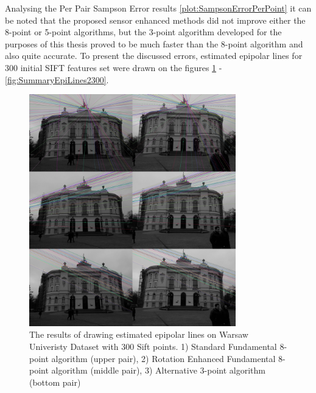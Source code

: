 Analysing the Per Pair Sampson Error results \ref{plot:SampsonErrorPerPoint} it can be noted that the proposed sensor enhanced methods did not improve either the 8-point or 5-point algorithms, but the 3-point algorithm developed for the purposes of this thesis proved to be much faster than the 8-point algorithm and also quite accurate. To present the discussed errors, estimated epipolar lines for 300 initial SIFT features set were drawn on the figures \ref{fig:SummaryEpiLines1300} - \ref{fig:SummaryEpiLines2300}.
\begin{figure}[b!]
    \centering
    \includegraphics[width=0.8\textwidth]{summary1Sift300}
    \caption{The results of drawing estimated epipolar lines on Warsaw Univeristy Dataset with 300 Sift points. 1) Standard Fundamental 8-point algorithm (upper pair), 2) Rotation Enhanced Fundamental 8-point algorithm (middle pair), 3) Alternative 3-point algorithm (bottom pair) }
    \label{fig:SummaryEpiLines1300}
\end{figure}
